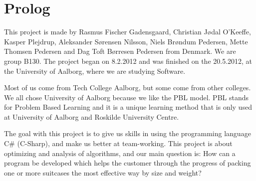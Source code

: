 \chapter{Prolog}

This project is made by Rasmus Fischer Gadensgaard, Christian Jødal O’Keeffe, Kasper Plejdrup, Aleksander Sørensen Nilsson, Niels Brøndum Pedersen, Mette Thomsen Pedersen and Dag Toft Børresen Pedersen from Denmark. We are group B130. The project began on 8.2.2012 and was finished on the 20.5.2012, at the University of Aalborg, where we are studying Software.

Most of us come from Tech College Aalborg, but some come from other colleges. We all chose University of Aalborg because we like the PBL model. PBL stands for Problem Based Learning and it is a unique learning method that is only used at University of Aalborg and Roskilde University Centre.

The goal with this project is to give us skills in using the programming language C# (C-Sharp), and make us better at team-working. This project is about optimizing and analysis of algorithms, and our main question is: How can a program be developed which helps the customer through the progress of packing one or more suitcases the most effective way by size and weight?
